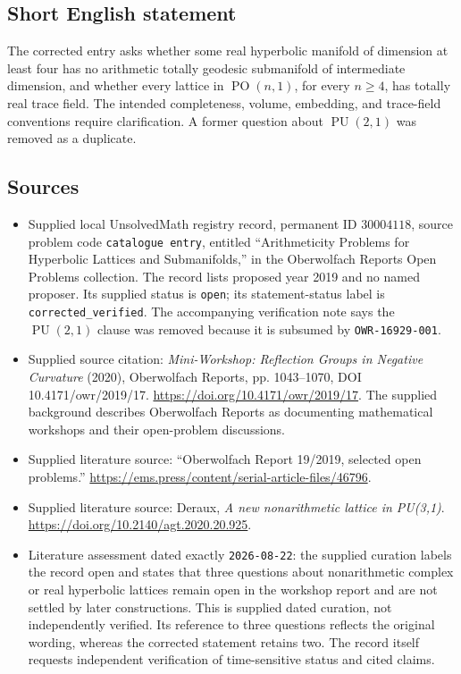 \documentclass[11pt]{article}
\begin{document}
\subsection{Short English statement}
The corrected entry asks whether some real hyperbolic manifold of dimension at least four has no arithmetic totally geodesic submanifold of intermediate dimension, and whether every lattice in \(\operatorname{PO}(n,1)\), for every \(n\geq4\), has totally real trace field. The intended completeness, volume, embedding, and trace-field conventions require clarification. A former question about \(\operatorname{PU}(2,1)\) was removed as a duplicate.
\subsection{Sources}
\begin{itemize}
\item Supplied local UnsolvedMath registry record, permanent ID \(30004118\), source problem code \texttt{catalogue entry}, entitled ``Arithmeticity Problems for Hyperbolic Lattices and Submanifolds,'' in the Oberwolfach Reports Open Problems collection. The record lists proposed year 2019 and no named proposer. Its supplied status is \texttt{open}; its statement-status label is \texttt{corrected\_verified}. The accompanying verification note says the \(\operatorname{PU}(2,1)\) clause was removed because it is subsumed by \texttt{OWR-16929-001}.
\item Supplied source citation: \emph{Mini-Workshop: Reflection Groups in Negative Curvature} (2020), Oberwolfach Reports, pp. 1043--1070, DOI 10.4171/owr/2019/17. \url{https://doi.org/10.4171/owr/2019/17}. The supplied background describes Oberwolfach Reports as documenting mathematical workshops and their open-problem discussions.
\item Supplied literature source: ``Oberwolfach Report 19/2019, selected open problems.'' \url{https://ems.press/content/serial-article-files/46796}.
\item Supplied literature source: Deraux, \emph{A new nonarithmetic lattice in PU(3,1)}. \url{https://doi.org/10.2140/agt.2020.20.925}.
\item Literature assessment dated exactly \texttt{2026-08-22}: the supplied curation labels the record open and states that three questions about nonarithmetic complex or real hyperbolic lattices remain open in the workshop report and are not settled by later constructions. This is supplied dated curation, not independently verified. Its reference to three questions reflects the original wording, whereas the corrected statement retains two. The record itself requests independent verification of time-sensitive status and cited claims.
\end{itemize}
\end{document}
